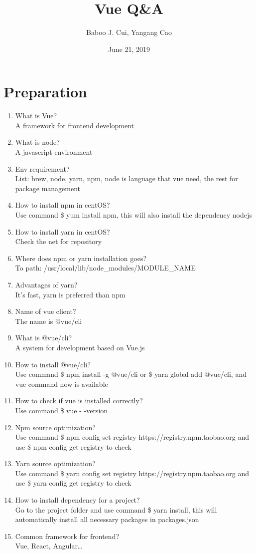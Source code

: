 \documentclass[10pt,a4paper,oneside]{article}
\date{June 21, 2019}
\author{Baboo J. Cui, Yangang Cao}
\title{Vue Q\&A}
\begin{document}
\maketitle
\tableofcontents

\newpage
\section{Preparation}
\begin{enumerate}[1.]
\item  What is Vue?  \\
A framework for frontend development
\item What is node?   \\
A javascript environment
\item   Env requirement? \\
List: brew, node, yarn, npm, node is language that vue need, the rest for package management
\item  How to install npm in centOS?  \\
Use command \$ yum install npm, this will also install the dependency nodejs
\item How to install yarn in centOS?   \\
Check the net for repository
\item   Where does npm or yarn installation goes? \\
To path: /usr/local/lib/node\_modules/MODULE\_NAME
\item   Advantages of yarn? \\
It’s fast, yarn is preferred than npm
\item  Name of vue client?  \\
The name is @vue/cli
\item  What is @vue/cli?  \\
A system for development based on Vue.js
\item  How to install @vue/cli?  \\
Use command \$ npm install -g @vue/cli or \$ yarn global add @vue/cli, and vue command now is available
\item  How to check if vue is installed correctly?  \\
Use command \$ vue - -version
\item   Npm source optimization? \\
Use command \$ npm config set registry https://registry.npm.taobao.org and use \$ npm config get registry to check
\item   Yarn source optimization?  \\
Use command \$ yarn config set registry https://registry.npm.taobao.org and use \$ yarn config get registry to check
\item  How to install dependency for a project?  \\
Go to the project folder and use command \$ yarn install, this will automatically install all necessary packages in packages.json
\item   Common framework for frontend? \\
Vue, React, Angular…
\end{enumerate}
\end{document}
